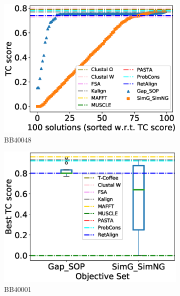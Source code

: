 \begin{figure}[!htbp]
\begin{adjustwidth}{-1.5cm}{-1cm}
\begin{subfigure}{0.22\textwidth}
			\includegraphics[width=\columnwidth]{Figure/summary/precomputedInit/Balibase/BB40048_tc_density_single_run_2}
			\caption{BB40048}
		\end{subfigure}
		\begin{subfigure}{0.22\textwidth}
			\includegraphics[width=\columnwidth]{Figure/summary/precomputedInit/Balibase/BB40001_objset_tc_rank_2}
			\caption{BB40001}
		\end{subfigure}	
		\begin{subfigure}{0.22\textwidth}

\end{subfigure}
\end{adjustwidth}
\end{figure}
